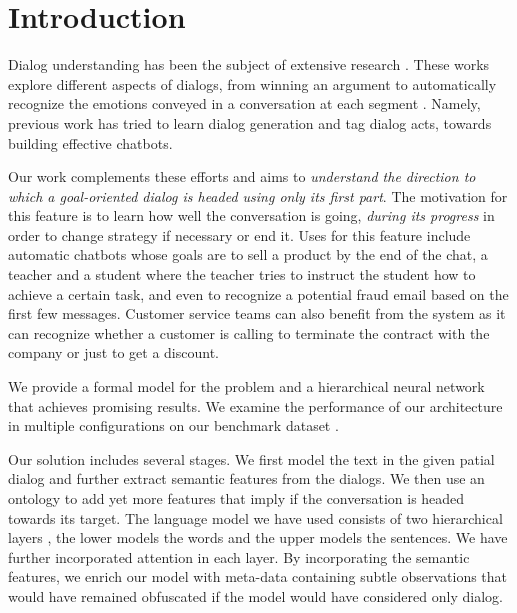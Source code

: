 \section{Introduction}\label{sec:into}
Dialog understanding has been the subject of 
extensive research \cite{BohusR03,BordesW16,GhazvininejadBC17,ShawarA03,DBLP:conf/icassp/JiB05,DBLP:conf/coling/WermterL96}. 
These works explore different aspects of dialogs, from winning an argument \cite{TanNDL16} 
to automatically recognize the emotions conveyed in a conversation at each segment \cite{AyadiKK11}. 
Namely, previous work \cite{ShawarA03,Jia09,ShawarA08,AngLS05,SurendranL06} has tried to learn dialog 
generation and tag dialog acts, towards building effective chatbots. 

Our work complements these efforts and aims to {\em understand the 
direction to which a goal-oriented dialog is headed using only its 
first part}. The motivation for this feature is to learn how 
well the conversation is going, {\em during its progress} in order 
to change strategy if necessary or end it. 
Uses for this feature include automatic chatbots whose goals 
are to sell a product by the end of the chat, a teacher and a student 
where the teacher tries to instruct the student how to achieve a certain task, 
and even to recognize a potential fraud email based on the first few 
messages.
Customer service teams can also benefit from the system as it can recognize 
whether a customer is calling to terminate the contract with the company 
or just to get a discount. 

We provide a formal model for the problem and a hierarchical neural network 
that achieves promising results. 
We examine the performance of our architecture 
in multiple configurations on our benchmark dataset \cite{frames}. 

Our solution includes several stages. 
We first model the text in the given patial dialog and further extract semantic features from the dialogs. 
We then use an ontology to add yet more features that imply if the conversation 
is headed towards its target. 
The language model we have used consists of two hierarchical layers \cite{attention}, the lower 
models the words and the upper models the sentences. We have further 
incorporated attention \cite{BahdanauCB14} in each layer. 
By incorporating the semantic features, 
we enrich our model with meta-data containing subtle observations 
that would have remained obfuscated if the model would have considered only dialog. 

